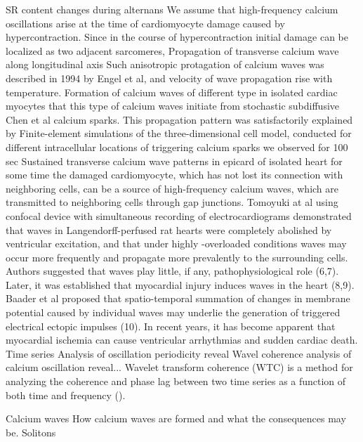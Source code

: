 \documentclass{biophys-new}
\begin{document}
SR  content changes during alternans \cite{diaz2004sarcoplasmic}
We assume that high-frequency calcium oscillations arise at the time of cardiomyocyte damage caused by hypercontraction.
Since in the course of hypercontraction initial damage can be localized as two adjacent sarcomeres,
Propagation of transverse calcium wave along longitudinal axis
Such anisotropic protagation of calcium waves was described in 1994 by Engel et al, and velocity of wave propagation rise with temperature.
Formation of calcium waves of different type in isolated cardiac myocytes \cite{ishida1999formation}
that this type of calcium waves initiate from stochastic \cite{izu2001evolution} subdiffusive  \cite{chen2014ryanodine} Chen et al  calcium sparks.
This propagation pattern was satisfactorily explained by Finite-element simulations of the three-dimensional cell model, conducted for different intracellular locations of triggering calcium sparks \cite{tracqui2009integrated}
we observed for 100 sec Sustained transverse calcium wave patterns in epicard of isolated heart
for some time the damaged cardiomyocyte, which has not lost its connection with neighboring cells, can be a source of high-frequency calcium waves, which are transmitted to neighboring cells through gap junctions.
Tomoyuki at al using confocal device with simultaneous recording of electrocardiograms demonstrated that  waves in Langendorff-perfused rat hearts were completely abolished by ventricular excitation, and that under highly  -overloaded conditions  waves may occur more frequently and propagate more prevalently to the surrounding cells. Authors suggested that  waves play little, if any, pathophysiological role (6,7). Later, it was established that myocardial injury induces  waves in the heart (8,9). Baader et al proposed that spatio-temporal summation of changes in membrane potential caused by individual  waves may underlie the generation of triggered electrical ectopic impulses (10).
In recent years, it has become apparent that myocardial ischemia can cause ventricular arrhythmias and sudden cardiac death.
Time series
Analysis of oscillation periodicity reveal
Wavel coherence analysis of calcium oscillation reveal...
Wavelet transform coherence (WTC) is a method for analyzing the coherence and phase lag between two time series as a function of both time and frequency (\cite{chang2010time}).

Calcium waves
How calcium waves are formed and what the consequences may be.
Solitons
\end{document}
